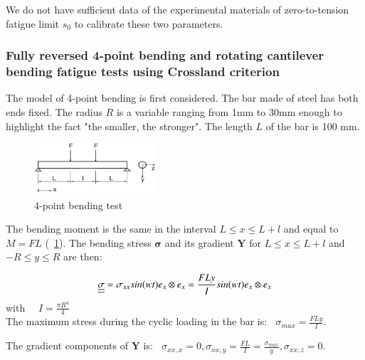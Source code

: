 \documentclass[3p,times,procedia,number]{elsarticle}
\newcommand{\figref}[1]{\figurename~\ref{#1}}
\begin{document}
We do not have sufficient data of the experimental materials of zero-to-tension fatigue limit $s_0$ to calibrate these two parameters.


\subsubsection{Fully reversed 4-point bending and rotating cantilever bending fatigue tests using Crossland criterion}
The model of 4-point bending is first considered. The bar made of steel has both ends fixed. The radius $R$ is a variable ranging from 1mm to 30mm enough to highlight the fact "the smaller, the stronger". The length $L$ of the bar is 100 mm.

\begin{figure}[h!]
	\centering
	\includegraphics[width=0.4\textwidth]{figures//fig11.jpg} 
	\caption{4-point bending test \cite{papadopoulos1996invariant} }
	\label{fig11}
\end{figure}

The bending moment is the same in the interval $L\leqslant x \leqslant L+l$ and equal to
$M = FL$ (\figref{fig11}). The bending stress $\bm{\sigma}$ and its gradient $\textbf{Y}$ for
$L\leqslant x \leqslant L+l$ and  $-R\leqslant y \leqslant R$ are then:

$$\uline{\uline{\sigma}}=\sigma_{xx}sin(wt)e_x\otimes e_x=\frac{FLy}{I}sin(wt) e_x\otimes e_x $$ 
with
$ \quad I=\frac{\pi R^4}{4}$\\
The maximum stress during the cyclic loading in the bar  is:
$\;\; \sigma_{max}=\frac{FLy}{I}$.

\noindent The gradient components of $\textbf{Y}$ is:
$\;\;\sigma_{xx,x}=0, \sigma_{xx,y}=\frac{FL}{I}=\frac{\sigma_{max}}{y},\sigma_{xx,z}=0$.
\end{document}
